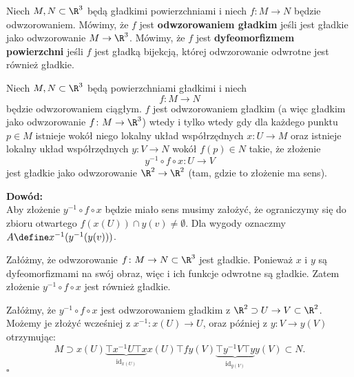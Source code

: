 \begin{frame}[<+->]

\begin{definicja}
Niech $M,N\subset \R^3$ będą gładkimi powierzchniami i niech $f\colon M\to N$ będzie odwzorowaniem. Mówimy, że $f$ jest \textbf{odwzorowaniem gładkim} jeśli jest gładkie jako odwzorowanie $M\to \R^3$. Mówimy, że $f$ jest \textbf{dyfeomorfizmem powierzchni} jeśli $f$ jest gładką bijekcją, której odwzorowanie odwrotne jest również gładkie.
\end{definicja}

\end{frame}
\begin{frame}[<+->]

\begin{lemat}
Niech $M,N\subset \R^3$ będą powierzchniami gładkimi i niech \[f\colon M\to N\] będzie odwzorowaniem ciągłym. $f$ jest odwzorowaniem gładkim (a więc gładkim jako odwzorowanie $f\colon M\to \R^3$) wtedy i tylko wtedy gdy dla każdego punktu $p\in M$ istnieje wokół niego lokalny układ współrzędnych $x\colon U\to M$ oraz istnieje lokalny układ współrzędnych $y\colon V\to N$ wokół $f(p)\in N$ takie, że złożenie
\[y^{-1}\circ f\circ x\colon U\to V\]
jest gładkie jako odwzorowanie $\R^2\to \R^2$ (tam, gdzie to złożenie ma sens).
\end{lemat}

\end{frame}
\begin{frame}[<+->]
\begin{center}

\end{center}

\end{frame}
\begin{frame}[<+->]

\textcolor{ared}{\textbf{Dowód:}}\\

\pause Aby złożenie $y^{-1}\circ f\circ x$ będzie miało sens musimy założyć, że ograniczymy się do zbioru otwartego $f(x(U))\cap y(v)\neq \emptyset$. Dla wygody oznaczmy $A\define x^{-1}(y^{-1}(y(v)))$.

\pause Załóżmy, że odwzorowanie $f\colon M\to N\subset \R^3$ jest gładkie. Ponieważ $x$ i $y$ są dyfeomorfizmami na swój obraz, więc i ich funkcje odwrotne są gładkie. Zatem złożenie $y^{-1}\circ f\circ x$ jest również gładkie.

\pause Załóżmy, że $y^{-1}\circ f\circ x$ jest odwzorowaniem gładkim z $\R^2\supset U\to V\subset \R^2$. Możemy je złożyć wcześniej z $x^{-1}\colon x(U)\to U$, oraz później z $y\colon V\to y(V)$ otrzymując:\pause
\[M \supset x(U)\underbrace{\top{x^{-1}}U\top{x}}_{\operatorname{id}_{x(U)}}x(U)\top{f}y(V) \underbrace{\top{y^{-1}}V\top{y}}_{\operatorname{id}_{y(V)}}y(V)\subset N.\]
\hfill $\square$

\end{frame}
